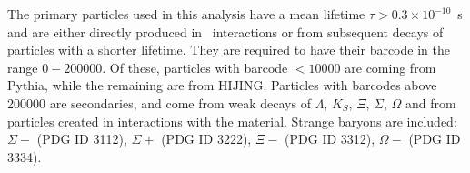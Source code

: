 The primary particles used in this analysis have a mean lifetime \mbox{$\tau > 0.3 \times 10^{-10}$~s} and are either directly produced in \pp\ interactions or from subsequent decays of particles with a shorter lifetime.
They are required to have their barcode in the range $0 - 200000$.
Of these, particles with barcode $< 10000$ are coming from Pythia, while the remaining are from HIJING.
Particles with barcodes above 200000 are secondaries, and come from weak decays of $\Lambda$, $K_{S}$, $\Xi$, $\Sigma$, $\Omega$ and from particles created in interactions with the material.
Strange baryons are included: $\Sigma-$ (PDG ID 3112), $\Sigma+$ (PDG ID 3222), $\Xi-$ (PDG ID 3312), $\Omega-$ (PDG ID 3334).


\begin{figure}
\end{figure}

